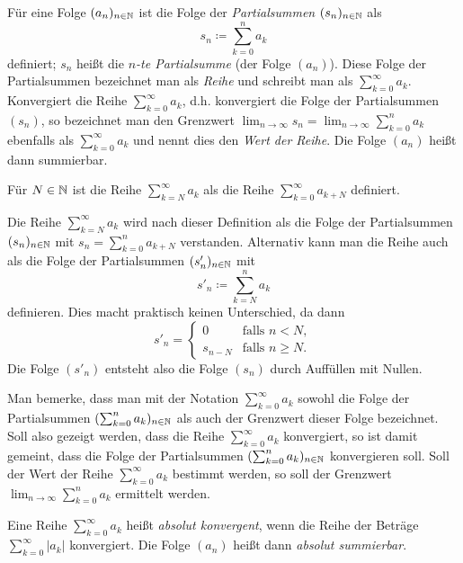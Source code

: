 \documentclass[a4paper,10pt]{article}
\begin{document}
\begin{defi}
 Für eine Folge $(a_n)_{n \in \mathbb{N}}$ ist die Folge der \emph{Partialsummen} $(s_n)_{n \in \mathbb{N}}$ als
 \[
  s_n \coloneqq \sum_{k=0}^n a_k
 \]
 definiert; $s_n$ heißt die \emph{$n$-te Partialsumme} (der Folge $(a_n)$). Diese Folge der Partialsummen bezeichnet man als \emph{Reihe} und schreibt man als $\sum_{k=0}^\infty a_k$. Konvergiert die Reihe $\sum_{k=0}^\infty a_k$, d.h. konvergiert die Folge der Partialsummen $(s_n)$, so bezeichnet man den Grenzwert $\lim_{n \to \infty} s_n = \lim_{n \to \infty} \sum_{k=0}^n a_k$ ebenfalls als $\sum_{k=0}^\infty a_k$ und nennt dies den \emph{Wert der Reihe}. Die Folge $(a_n)$ heißt dann summierbar.
 
 Für $N \in \mathbb{N}$ ist die Reihe $\sum_{k=N}^\infty a_k$ als die Reihe $\sum_{k=0}^\infty a_{k+N}$ definiert.  
\end{defi}


\begin{bem}
 Die Reihe $\sum_{k=N}^\infty a_k$ wird nach dieser Definition als die Folge der Partialsummen $(s_n)_{n \in \mathbb{N}}$ mit $s_n = \sum_{k=0}^n a_{k+N}$ verstanden. Alternativ kann man die Reihe auch als die Folge der Partialsummen $(s'_n)_{n \in \mathbb{N}}$ mit
 \[
  s'_n \coloneqq \sum_{k=N}^n a_k
 \]
 definieren. Dies macht praktisch keinen Unterschied, da dann
 \[
  s'_n =
  \begin{cases}
   0       & \text{falls } n < N, \\
   s_{n-N} & \text{falls } n \geq N.
  \end{cases}
 \]
 Die Folge $(s'_n)$ entsteht also die Folge $(s_n)$ durch Auffüllen mit Nullen.
\end{bem}


Man bemerke, dass man mit der Notation $\sum_{k=0}^\infty a_k$ sowohl die Folge der Partialsummen $(\sum_{k=0}^n a_k)_{n \in \mathbb{N}}$ als auch der Grenzwert dieser Folge bezeichnet. Soll also gezeigt werden, dass die Reihe $\sum_{k=0}^\infty a_k$ konvergiert, so ist damit gemeint, dass die Folge der Partialsummen $(\sum_{k=0}^n a_k)_{n \in \mathbb{N}}$ konvergieren soll. Soll der Wert der Reihe $\sum_{k=0}^\infty a_k$ bestimmt werden, so soll der Grenzwert $\lim_{n \to \infty} \sum_{k=0}^n a_k$ ermittelt werden.


\begin{defi}
 Eine Reihe $\sum_{k=0}^\infty a_k$ heißt \emph{absolut konvergent}, wenn die Reihe der Beträge $\sum_{k=0}^\infty |a_k|$ konvergiert. Die Folge $(a_n)$ heißt dann \emph{absolut summierbar}.
\end{defi}
\end{document}
